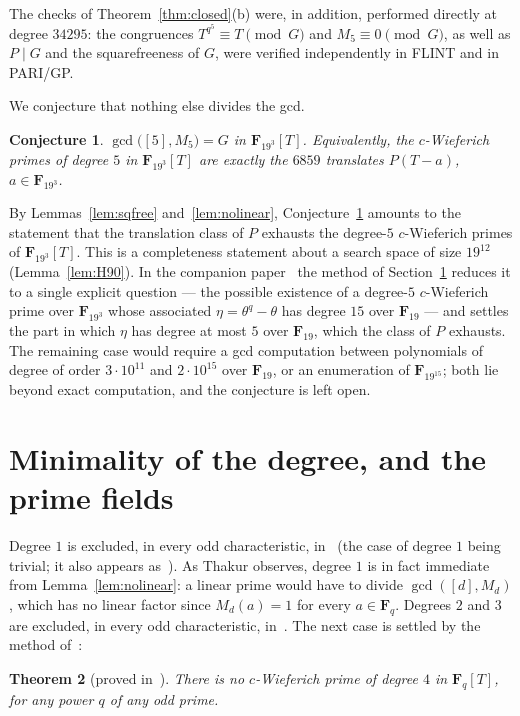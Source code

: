 \documentclass[11pt]{amsart}
\newcommand{\F}{\mathbf{F}}
\theoremstyle{plain}
\newtheorem{theorem}{Theorem}[section]
\newtheorem{conjecture}[theorem]{Conjecture}
\theoremstyle{definition}
\begin{document}
The checks of Theorem~\ref{thm:closed}(b) were, in addition, performed directly
at degree $34295$: the congruences $T^{q^5}\equiv T\pmod G$ and
$M_5\equiv0\pmod G$, as well as $P\mid G$ and the squarefreeness of $G$, were
verified independently in FLINT and in PARI/GP.

We conjecture that nothing else divides the gcd.

\begin{conjecture}\label{conj:exact}
$\gcd\bigl([5],M_5\bigr)=G$ in $\F_{19^3}[T]$. Equivalently, the $c$-Wieferich
primes of degree $5$ in $\F_{19^3}[T]$ are exactly the $6859$ translates
$P(T-a)$, $a\in\F_{19^3}$.
\end{conjecture}

By Lemmas~\ref{lem:sqfree} and~\ref{lem:nolinear}, Conjecture~\ref{conj:exact}
amounts to the statement that the translation class of $P$ exhausts the
degree-$5$ $c$-Wieferich primes of $\F_{19^3}[T]$. This is a completeness
statement about a search space of size $19^{12}$ (Lemma~\ref{lem:H90}). In the
companion paper~\cite{NG2} the method of Section~\ref{sec:grid} reduces it to a
single explicit question --- the possible existence of a degree-$5$
$c$-Wieferich prime over $\F_{19^3}$ whose associated $\eta=\theta^q-\theta$ has
degree $15$ over $\F_{19}$ --- and settles the part in which $\eta$ has degree
at most $5$ over $\F_{19}$, which the class of $P$ exhausts. The remaining case
would require a gcd computation between polynomials of degree of order
$3\cdot10^{11}$ and $2\cdot10^{15}$ over $\F_{19}$, or an enumeration of
$\F_{19^{15}}$; both lie beyond exact computation, and the conjecture is left
open.

\section{Minimality of the degree, and the prime fields}\label{sec:grid}

Degree $1$ is excluded, in every odd characteristic, in~\cite{Tha15} (the case
of degree $1$ being trivial; it also appears as~\cite[Cor.~4.5]{Bam17}). As
Thakur observes, degree $1$ is in fact immediate from
Lemma~\ref{lem:nolinear}: a linear prime would have to divide $\gcd([d],M_d)$,
which has no linear factor since $M_d(a)=1$ for every $a\in\F_q$. Degrees $2$
and $3$ are excluded, in every odd characteristic, in~\cite{Tha15}. The next
case is settled by the method of~\cite{NG2}:

\begin{theorem}[proved in~\cite{NG2}]\label{thm:deg4}
There is no $c$-Wieferich prime of degree $4$ in $\F_q[T]$, for any power $q$ of
any odd prime.
\end{theorem}
\end{document}
